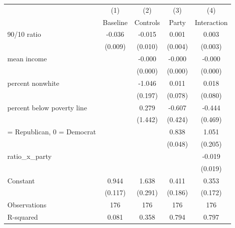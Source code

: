 \begin{tabular}{lcccc}
\toprule
                    &\multicolumn{1}{c}{(1)}&\multicolumn{1}{c}{(2)}&\multicolumn{1}{c}{(3)}&\multicolumn{1}{c}{(4)}\\
                    &\multicolumn{1}{c}{Baseline}&\multicolumn{1}{c}{Controls}&\multicolumn{1}{c}{Party}&\multicolumn{1}{c}{Interaction}\\
\midrule
90/10 ratio         &      -0.036\sym{***}&      -0.015         &       0.001         &       0.003         \\
                    &     (0.009)         &     (0.010)         &     (0.004)         &     (0.003)         \\
\addlinespace
mean income         &                     &      -0.000\sym{***}&      -0.000\sym{**} &      -0.000\sym{**} \\
                    &                     &     (0.000)         &     (0.000)         &     (0.000)         \\
\addlinespace
percent nonwhite    &                     &      -1.046\sym{***}&       0.011         &       0.018         \\
                    &                     &     (0.197)         &     (0.078)         &     (0.080)         \\
\addlinespace
percent below poverty line&                     &       0.279         &      -0.607         &      -0.444         \\
                    &                     &     (1.442)         &     (0.424)         &     (0.469)         \\
\addlinespace
1 = Republican, 0 = Democrat&                     &                     &       0.838\sym{***}&       1.051\sym{***}\\
                    &                     &                     &     (0.048)         &     (0.205)         \\
\addlinespace
ratio\_x\_party       &                     &                     &                     &      -0.019         \\
                    &                     &                     &                     &     (0.019)         \\
\addlinespace
Constant            &       0.944\sym{***}&       1.638\sym{***}&       0.411\sym{**} &       0.353\sym{**} \\
                    &     (0.117)         &     (0.291)         &     (0.186)         &     (0.172)         \\
\midrule
Observations        &         176         &         176         &         176         &         176         \\
R-squared           &       0.081         &       0.358         &       0.794         &       0.797         \\
\bottomrule
\end{tabular}
